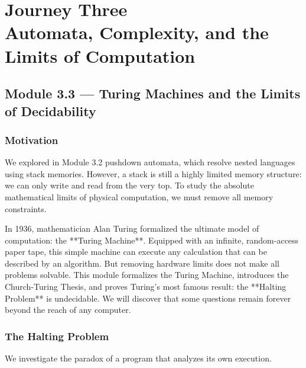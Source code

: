 \documentclass[12pt, a4paper]{book}
\begin{document}
\setcounter{chapter}{2}
\chapter[Journey 3 --- Automata, Complexity, and the Limits of Computation]
        {Journey Three\\[8pt]
         \textcolor{ModuleColor}{\large Automata, Complexity, and the Limits of Computation}}
\setcounter{section}{2}

\section{Module 3.3 --- Turing Machines and the Limits of Decidability}
\label{sec:mod3.3}

\subsection*{Motivation}

We explored in Module 3.2 pushdown automata, which resolve nested languages using stack memories.
However, a stack is still a highly limited memory structure: we can only write and read from the very top.
To study the absolute mathematical limits of physical computation, we must remove all memory constraints.

In 1936, mathematician Alan Turing formalized the ultimate model of computation: the **Turing Machine**.
Equipped with an infinite, random-access paper tape, this simple machine can execute any calculation that can be described by an algorithm.
But removing hardware limits does not make all problems solvable.
This module formalizes the Turing Machine, introduces the Church-Turing Thesis, and proves Turing's most famous result: the **Halting Problem** is undecidable.
We will discover that some questions remain forever beyond the reach of any computer.

\subsection{The Halting Problem}

We investigate the paradox of a program that analyzes its own execution.
\end{document}
